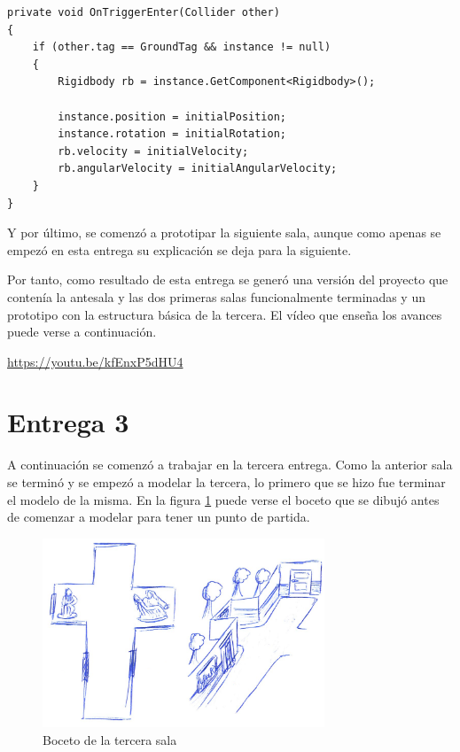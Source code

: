 \begin{lstlisting}[caption=Fragmento del script para teletransportar un objeto si toca el suelo, label=lst:object-teletransporter]
private void OnTriggerEnter(Collider other)
{
    if (other.tag == GroundTag && instance != null)
    {
        Rigidbody rb = instance.GetComponent<Rigidbody>();

        instance.position = initialPosition;
        instance.rotation = initialRotation;
        rb.velocity = initialVelocity;
        rb.angularVelocity = initialAngularVelocity;
    }
}
\end{lstlisting}


Y por último, se comenzó a prototipar la siguiente sala, aunque como apenas se empezó en esta entrega su explicación se deja para la siguiente.

Por tanto, como resultado de esta entrega se generó una versión del proyecto que contenía la antesala y las dos primeras salas funcionalmente terminadas y un prototipo con la estructura básica de la tercera. El vídeo que enseña los avances puede verse a continuación.

\begin{center}
    \url{https://youtu.be/kfEnxP5dHU4}
\end{center}

\section{Entrega 3}

A continuación se comenzó a trabajar en la tercera entrega. Como la anterior sala se terminó y se empezó a modelar la tercera, lo primero que se hizo fue terminar el modelo de la misma. En la figura \ref{fig:bocetos-sala-3} puede verse el boceto que se dibujó antes de comenzar a modelar para tener un punto de partida.

\begin{figure}[!h]
\begin{center}
\includegraphics[width=0.75\textwidth]{imagenes/7/bocetos/boceto-sala-3.png}
\caption{Boceto de la tercera sala}
\label{fig:bocetos-sala-3}
\end{center}
\end{figure}


